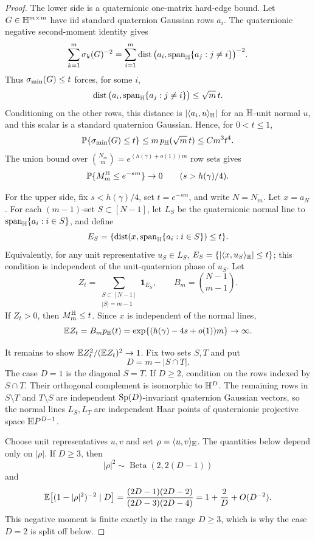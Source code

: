 \begin{proof}
The lower side is a quaternionic one-matrix hard-edge bound.  Let
\(G\in\mathbb{H}^{m\times m}\) have iid standard quaternion Gaussian rows \(a_i\).
The quaternionic negative second-moment identity gives
\[
  \sum_{k=1}^m\sigma_k(G)^{-2}
  =
  \sum_{i=1}^m
  \operatorname{dist}\big(a_i,\operatorname{span}_{\mathbb{H}}\{a_j:j\ne i\}\big)^{-2}.
\]
Thus \(\sigma_{\min}(G)\le t\) forces, for some \(i\),
\[
  \operatorname{dist}\big(a_i,\operatorname{span}_{\mathbb{H}}\{a_j:j\ne i\}\big)\le \sqrt m\,t .
\]
Conditioning on the other rows, this distance is
\(|\langle a_i,u\rangle_{\mathbb{H}}|\) for an \(\mathbb{H}\)-unit normal \(u\), and this
scalar is a standard quaternion Gaussian.  Hence, for \(0<t\le1\),
\[
  \mathbb{P}\{\sigma_{\min}(G)\le t\}
  \le m\,p_{\mathbb{H}}(\sqrt m\,t)
  \le C m^3t^4.
\]
The union bound over \(\binom{N_m}{m}=e^{(h(\gamma)+o(1))m}\) row sets gives
\[
  \mathbb{P}\{M_m^{\mathbb{H}}\le e^{-sm}\}\to0\qquad(s>h(\gamma)/4).
\]

For the upper side, fix \(s<h(\gamma)/4\), set \(t=e^{-sm}\), and write
\(N=N_m\).  Let \(x=a_N\).  For each
\((m-1)\)-set \(S\subset[N-1]\), let \(L_S\) be the quaternionic normal line to
\(\operatorname{span}_{\mathbb{H}}\{a_i:i\in S\}\), and define
\[
  E_S=\{\operatorname{dist}(x,\operatorname{span}_{\mathbb{H}}\{a_i:i\in S\})\le t\}.
\]
Equivalently, for any unit representative \(u_S\in L_S\),
\(E_S=\{|\langle x,u_S\rangle_{\mathbb{H}}|\le t\}\); this condition is independent of
the unit-quaternion phase of \(u_S\).  Let
\[
  Z_t=\sum_{\substack{S\subset[N-1]\\ |S|=m-1}}\mathbf1_{E_S},
  \qquad B_m=\binom{N-1}{m-1}.
\]
If \(Z_t>0\), then \(M_m^{\mathbb{H}}\le t\).  Since \(x\) is independent of the
normal lines,
\[
  \mathbb{E} Z_t=B_m p_{\mathbb{H}}(t)=\exp\{(h(\gamma)-4s+o(1))m\}\to\infty.
\]

It remains to show \(\mathbb{E} Z_t^2/(\mathbb{E} Z_t)^2\to1\).  Fix two sets \(S,T\) and put
\[
  D=m-|S\cap T|.
\]
The case \(D=1\) is the diagonal \(S=T\).  If \(D\ge2\), condition on the rows
indexed by \(S\cap T\).  Their orthogonal complement is isomorphic to
\(\mathbb{H}^D\).  The remaining rows in \(S\setminus T\) and \(T\setminus S\) are
independent \(\operatorname{Sp}(D)\)-invariant quaternion Gaussian vectors, so the normal
lines \(L_S,L_T\) are independent Haar points of quaternionic projective space
\(\mathbb{H} P^{D-1}\).

Choose unit representatives \(u,v\) and set
\(\rho=\langle u,v\rangle_{\mathbb{H}}\).  The quantities below depend only on
\(|\rho|\).  If \(D\ge3\), then
\[
  |\rho|^2\sim\operatorname{Beta}(2,2(D-1))
\]
and
\[
  \mathbb{E}\big[(1-|\rho|^2)^{-2}\mid D\big]
  =
  \frac{(2D-1)(2D-2)}{(2D-3)(2D-4)}
  =1+\frac2D+O(D^{-2}).
\]
This negative moment is finite exactly in the range \(D\ge3\), which is why
the case \(D=2\) is split off below.


\end{proof}
